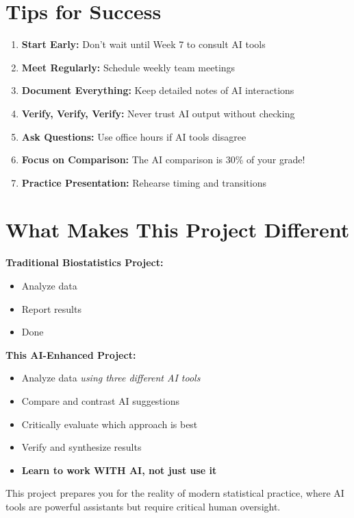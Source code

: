 \documentclass[11pt]{article}
\begin{document}
\section{Tips for Success}

\begin{enumerate}
\item \textbf{Start Early:} Don't wait until Week 7 to consult AI tools
\item \textbf{Meet Regularly:} Schedule weekly team meetings
\item \textbf{Document Everything:} Keep detailed notes of AI interactions
\item \textbf{Verify, Verify, Verify:} Never trust AI output without checking
\item \textbf{Ask Questions:} Use office hours if AI tools disagree
\item \textbf{Focus on Comparison:} The AI comparison is 30\% of your grade!
\item \textbf{Practice Presentation:} Rehearse timing and transitions
\end{enumerate}

\section{What Makes This Project Different}

\begin{tcolorbox}[colback=aiblue!5,colframe=aiblue,boxrule=1pt,arc=2pt,left=6pt,right=6pt,top=6pt,bottom=6pt]
\textbf{Traditional Biostatistics Project:}
\begin{itemize}
\item Analyze data
\item Report results
\item Done
\end{itemize}

\textbf{This AI-Enhanced Project:}
\begin{itemize}
\item Analyze data \textit{using three different AI tools}
\item Compare and contrast AI suggestions
\item Critically evaluate which approach is best
\item Verify and synthesize results
\item \textbf{Learn to work WITH AI, not just use it}
\end{itemize}
\end{tcolorbox}

This project prepares you for the reality of modern statistical practice, where AI tools are powerful assistants but require critical human oversight.
\end{document}
